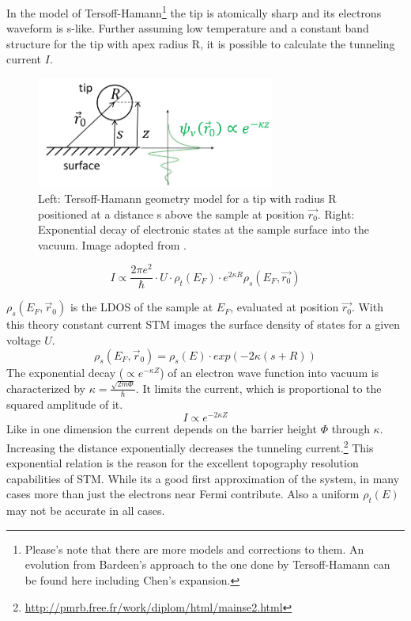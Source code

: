 In the model of Tersoff-Hamann\footnote{Please's note that there are more models and corrections to them. An evolution from Bardeen's approach to the one done by Tersoff-Hamann can be found here \cite{lounis_theory_2014, wortmann_interpretation_2000} including Chen's expansion.} the tip is atomically sharp and its electrons waveform is s-like. Further assuming low temperature and a constant band structure for the tip with apex radius R, it is possible to calculate the tunneling current $I$. 

\begin{figure}\centering
	\includegraphics[width=0.7\textwidth]{./images/TH-tip-model}
	\caption{Left: Tersoff-Hamann geometry model for a tip with radius R  positioned at a distance s above the sample at position $\vec{r_0}$. Right: Exponential decay of electronic states at the sample surface into the vacuum. Image adopted from \cite{STM_theory_versuch_temirov}.}
	\label{fig:STM-TH_model}
\end{figure}

$$I \propto \frac{2 \pi e^2}{\hbar} \cdot U \cdot \rho_t(E_F) \cdot e^{2\kappa R} \rho_s(E_F,\vec{ r_0})$$

$\rho_s(E_F,\vec r_0)$ is the LDOS of the sample at $E_F$, evaluated at position $\vec{r_0}$.
With this theory constant current STM images the surface density of states for  a given voltage $U$. 
$$\rho_s(E_F,\vec r_0)= \rho_s(E) \cdot exp(-2\kappa (s+R))$$
The exponential decay ($\propto e^{-\kappa Z}$) of an electron wave function into vacuum is characterized by $\kappa=\frac{\sqrt{2m\Phi}}{\hbar}$. It limits the current, which is proportional to the squared amplitude of it. 
$$I\propto e^{-2\kappa Z}$$
Like in one dimension the current depends on the barrier height $\Phi$ through $\kappa$. Increasing the distance exponentially decreases the tunneling current.\footnote{\url{http://pmrb.free.fr/work/diplom/html/mainse2.html} } This exponential relation is the reason for the excellent topography resolution capabilities of STM. While its a good first approximation of the system, in many cases more than just the electrons near Fermi contribute. Also a uniform $\rho_t(E)$ may not be accurate in all cases.

